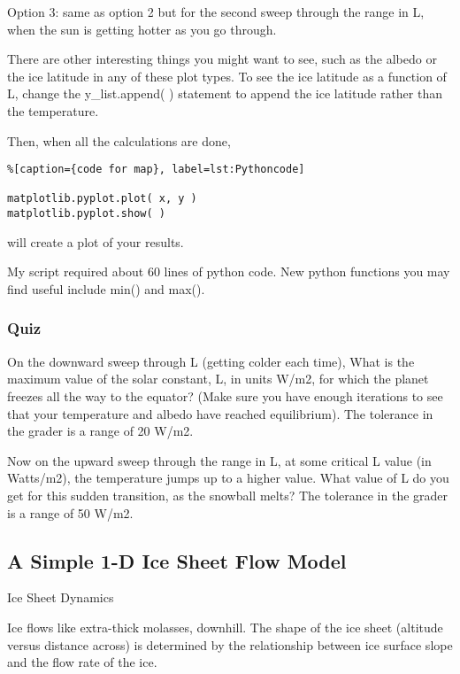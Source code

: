 {Option 3: same as option 2 but for the second sweep through the range in L, when the sun is getting hotter as you go through.

There are other interesting things you might want to see, such as the albedo or the ice latitude in any of these plot types. To see the ice latitude as a function of L, change the y_list.append( ) statement to append the ice latitude rather than the temperature.

Then, when all the calculations are done,


\begin{lstlisting}%[caption={code for map}, label=lst:Pythoncode]

matplotlib.pyplot.plot( x, y )
matplotlib.pyplot.show( )
\end{lstlisting}

will create a plot of your results.

My script required about 60 lines of python code. New python functions you may find useful include min() and max().


\subsubsection{Quiz}\index{}


On the downward sweep through L (getting colder each time), What is the maximum value of the solar constant, L, in units W/m2, for which the planet freezes all the way to the equator? (Make sure you have enough iterations to see that your temperature and albedo have reached equilibrium). The tolerance in the grader is a range of 20 W/m2.


Now on the upward sweep through the range in L, at some critical L value (in Watts/m2), the temperature jumps up to a higher value. What value of L do you get for this sudden transition, as the snowball melts? The tolerance in the grader is a range of 50 W/m2.



\subsection{A Simple 1-D Ice Sheet Flow Model}

Ice Sheet Dynamics

Ice flows like extra-thick molasses, downhill. The shape of the ice sheet (altitude versus distance across) is determined by the relationship between ice surface slope and the flow rate of the ice.


}
